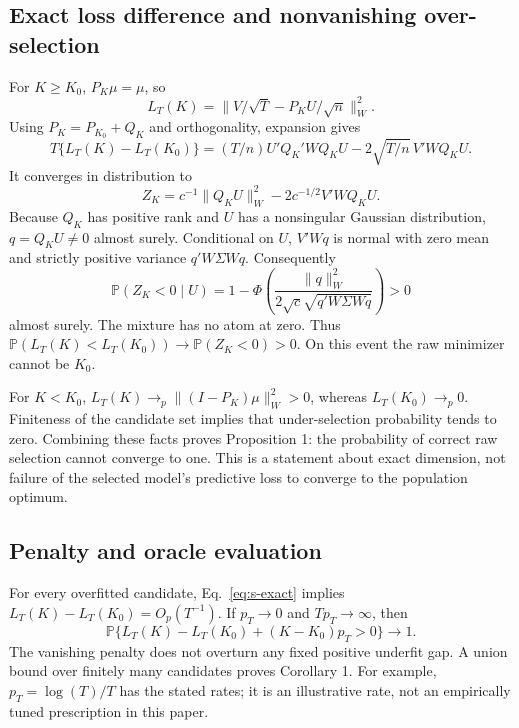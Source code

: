 \documentclass[11pt]{article}
\newcommand{\PP}{\mathbb P}
\begin{document}
\subsection{Exact loss difference and nonvanishing over-selection}
For $K\ge K_0$, $P_K\mu=\mu$, so
\begin{equation}
L_T(K)=\|V/\sqrt T-P_KU/\sqrt n\|_W^2.
\end{equation}
Using $P_K=P_{K_0}+Q_K$ and orthogonality, expansion gives
\begin{equation}
T\{L_T(K)-L_T(K_0)\}=(T/n)U'Q_K'WQ_KU-2\sqrt{T/n}\,V'WQ_KU.
\label{eq:s-exact}
\end{equation}
It converges in distribution to
\begin{equation}
Z_K=c^{-1}\|Q_KU\|_W^2-2c^{-1/2}V'WQ_KU.
\end{equation}
Because $Q_K$ has positive rank and $U$ has a nonsingular Gaussian distribution, $q=Q_KU\ne0$ almost surely. Conditional on $U$, $V'Wq$ is normal with zero mean and strictly positive variance $q'W\Sigma Wq$. Consequently
\begin{equation}
\PP(Z_K<0\mid U)=1-\Phi\!\left(\frac{\|q\|_W^2}{2\sqrt c\sqrt{q'W\Sigma Wq}}\right)>0
\end{equation}
almost surely. The mixture has no atom at zero. Thus $\PP(L_T(K)<L_T(K_0))\to\PP(Z_K<0)>0$. On this event the raw minimizer cannot be $K_0$.

For $K<K_0$, $L_T(K)\to_p\|(I-P_K)\mu\|_W^2>0$, whereas $L_T(K_0)\to_p0$. Finiteness of the candidate set implies that under-selection probability tends to zero. Combining these facts proves Proposition 1: the probability of correct raw selection cannot converge to one. This is a statement about exact dimension, not failure of the selected model's predictive loss to converge to the population optimum.

\subsection{Penalty and oracle evaluation}
For every overfitted candidate, Eq.~\eqref{eq:s-exact} implies $L_T(K)-L_T(K_0)=O_p(T^{-1})$. If $p_T\to0$ and $Tp_T\to\infty$, then
\begin{equation}
\PP\{L_T(K)-L_T(K_0)+(K-K_0)p_T>0\}\to1.
\end{equation}
The vanishing penalty does not overturn any fixed positive underfit gap. A union bound over finitely many candidates proves Corollary 1. For example, $p_T=\log(T)/T$ has the stated rates; it is an illustrative rate, not an empirically tuned prescription in this paper.
\end{document}
